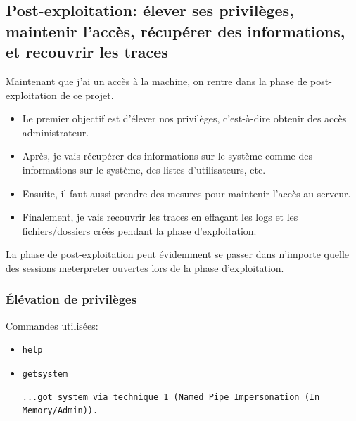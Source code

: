 \documentclass[a4paper]{article}
\begin{document}
\newpage \subsection{Post-exploitation: élever ses privilèges, maintenir l'accès, récupérer des informations, et recouvrir les traces}





Maintenant que j'ai un accès à la machine, on rentre dans la phase de post-exploitation de ce projet.
\begin{itemize}
    \item Le premier objectif est d'élever nos privilèges, c'est-à-dire obtenir des accès administrateur.
    \item Après, je vais récupérer des informations sur le système comme des informations sur le système, des listes d'utilisateurs, etc.
    \item Ensuite, il faut aussi prendre des mesures pour maintenir l'accès au serveur.
    \item Finalement, je vais recouvrir les traces en effaçant les logs et les fichiers/dossiers créés pendant la phase d'exploitation.
\end{itemize}

La phase de post-exploitation peut évidemment se passer dans n'importe quelle des sessions meterpreter ouvertes lors de la phase d'exploitation.





\subsubsection{Élévation de privilèges}






Commandes utilisées:
\begin{itemize}
    \item \texttt{\footnotesize help}
    \item \texttt{\footnotesize getsystem}
    \begin{example}
\begin{Verbatim}[fontsize=\footnotesize]
...got system via technique 1 (Named Pipe Impersonation (In Memory/Admin)).
\end{Verbatim}
    \end{example}
\end{itemize}
\end{document}
